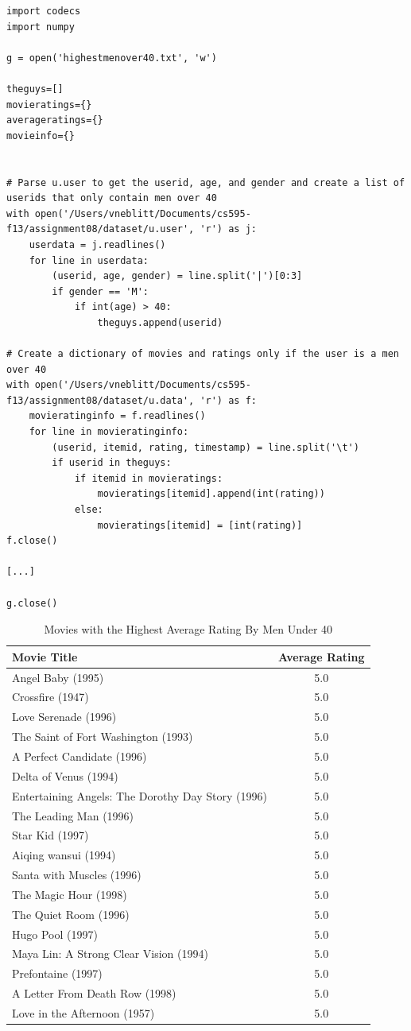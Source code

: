 \documentclass{article}
\begin{document}
\begin{lstlisting}[frame=single, caption=highestmenover40.py, label=highestmenover40]
import codecs
import numpy

g = open('highestmenover40.txt', 'w')

theguys=[]
movieratings={}
averageratings={}
movieinfo={}


# Parse u.user to get the userid, age, and gender and create a list of userids that only contain men over 40
with open('/Users/vneblitt/Documents/cs595-f13/assignment08/dataset/u.user', 'r') as j:
	userdata = j.readlines()
	for line in userdata:
		(userid, age, gender) = line.split('|')[0:3]
		if gender == 'M':
			if int(age) > 40:
				theguys.append(userid)

# Create a dictionary of movies and ratings only if the user is a men over 40
with open('/Users/vneblitt/Documents/cs595-f13/assignment08/dataset/u.data', 'r') as f:
	movieratinginfo = f.readlines()
	for line in movieratinginfo:
		(userid, itemid, rating, timestamp) = line.split('\t')
		if userid in theguys:
			if itemid in movieratings:
				movieratings[itemid].append(int(rating))
			else:
				movieratings[itemid] = [int(rating)]
f.close()

[...]

g.close()
\end{lstlisting}

\begin{table}[!h]
\centering
\begin{tabular}{l c}
Movie Title & Average Rating \\
\hline
Angel Baby (1995) & 5.0 \\
Crossfire (1947) & 5.0 \\
Love Serenade (1996) & 5.0 \\
The Saint of Fort Washington (1993) & 5.0 \\
A Perfect Candidate (1996) & 5.0 \\
Delta of Venus (1994) & 5.0 \\
Entertaining Angels: The Dorothy Day Story (1996) & 5.0 \\
The Leading Man (1996) & 5.0 \\
Star Kid (1997) & 5.0 \\
Aiqing wansui (1994) & 5.0 \\
Santa with Muscles (1996) & 5.0 \\
The Magic Hour (1998) & 5.0 \\
The Quiet Room (1996) & 5.0 \\
Hugo Pool (1997) & 5.0 \\
Maya Lin: A Strong Clear Vision (1994) & 5.0 \\
Prefontaine (1997) & 5.0 \\
A Letter From Death Row (1998) & 5.0 \\
Love in the Afternoon (1957) & 5.0 \\
\hline
\end{tabular}
\caption{Movies with the Highest Average Rating By Men Under 40}
\end{table}
\end{document}

